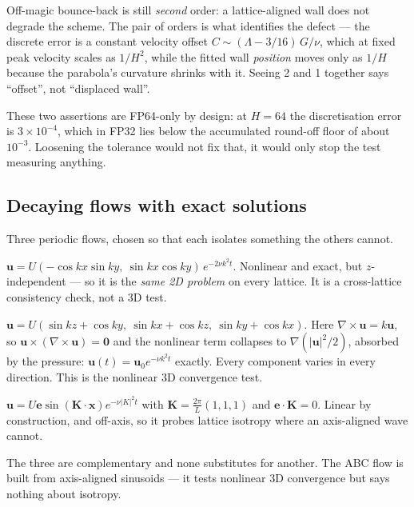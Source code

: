 \documentclass[11pt,a4paper]{article}
\newcommand{\uu}{\bm{u}}
\newcommand{\xx}{\bm{x}}
\begin{document}
\noindent Off-magic bounce-back is still \emph{second} order: a lattice-aligned
wall does not degrade the scheme. The pair of orders is what identifies the
defect --- the discrete error is a constant velocity offset
$C \sim (\Lambda-3/16)\,G/\nu$, which at fixed peak velocity scales as $1/H^2$,
while the fitted wall \emph{position} moves only as $1/H$ because the parabola's
curvature shrinks with it. Seeing 2 and 1 together says ``offset'', not
``displaced wall''.

These two assertions are FP64-only by design: at $H=64$ the discretisation error
is $3\times10^{-4}$, which in FP32 lies below the accumulated round-off floor of
about $10^{-3}$. Loosening the tolerance would not fix that, it would only stop
the test measuring anything.

\subsection{Decaying flows with exact solutions}

Three periodic flows, chosen so that each isolates something the others cannot.

\begin{description}[leftmargin=1.6em,itemsep=3pt]
\item[Taylor--Green] $\uu = U(-\cos kx\sin ky,\ \sin kx\cos ky)\,e^{-2\nu k^2t}$.
  Nonlinear and exact, but $z$-independent --- so it is the \emph{same 2D problem}
  on every lattice. It is a cross-lattice consistency check, not a 3D test.
\item[ABC / Beltrami] $\uu = U(\sin kz+\cos ky,\ \sin kx+\cos kz,\ \sin ky+\cos kx)$.
  Here $\nabla\times\uu = k\uu$, so $\uu\times(\nabla\times\uu)=\bm0$ and the
  nonlinear term collapses to $\nabla(|\uu|^2/2)$, absorbed by the pressure:
  $\uu(t)=\uu_0e^{-\nu k^2t}$ exactly. Every component varies in every direction.
  This is the nonlinear 3D convergence test.
\item[Diagonal shear wave] $\uu = U\bm{e}\sin(\bm{K}\!\cdot\!\xx)e^{-\nu|K|^2t}$
  with $\bm{K}=\tfrac{2\pi}{L}(1,1,1)$ and $\bm{e}\!\cdot\!\bm{K}=0$. Linear by
  construction, and off-axis, so it probes lattice isotropy where an axis-aligned
  wave cannot.
\end{description}

\noindent The three are complementary and none substitutes for another. The ABC
flow is built from axis-aligned sinusoids --- it tests nonlinear 3D convergence
but says nothing about isotropy.
\end{document}
